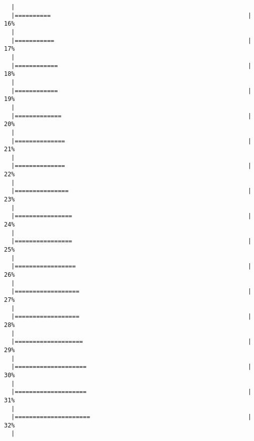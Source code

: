 \documentclass[]{article}
\begin{document}
\begin{verbatim}
  |                                                                       
  |==========                                                       |  16%
  |                                                                       
  |===========                                                      |  17%
  |                                                                       
  |============                                                     |  18%
  |                                                                       
  |============                                                     |  19%
  |                                                                       
  |=============                                                    |  20%
  |                                                                       
  |==============                                                   |  21%
  |                                                                       
  |==============                                                   |  22%
  |                                                                       
  |===============                                                  |  23%
  |                                                                       
  |================                                                 |  24%
  |                                                                       
  |================                                                 |  25%
  |                                                                       
  |=================                                                |  26%
  |                                                                       
  |==================                                               |  27%
  |                                                                       
  |==================                                               |  28%
  |                                                                       
  |===================                                              |  29%
  |                                                                       
  |====================                                             |  30%
  |                                                                       
  |====================                                             |  31%
  |                                                                       
  |=====================                                            |  32%
  |                                                                       

\end{verbatim}
\end{document}

